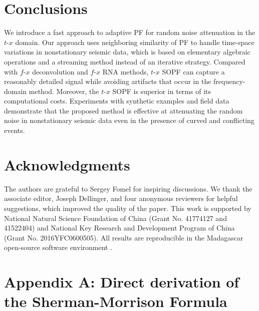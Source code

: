 

\section{Conclusions}
We introduce a fast approach to adaptive PF for random noise
attenuation in the $t$-$x$ domain. Our approach uses neighboring
similarity of PF to handle time-space variations in nonstationary
seismic data, which is based on elementary algebraic operations and a
streaming method instead of an iterative strategy. Compared with
$f$-$x$ deconvolution and $f$-$x$ RNA methods, $t$-$x$ SOPF can
capture a reasonably detailed signal while
avoiding artifacts that occur in the frequency-domain
method. Moreover, the $t$-$x$ SOPF is superior in terms of its
computational costs. Experiments with synthetic examples and field
data demonstrate that the proposed method is effective at attenuating
the random noise in nonstationary seismic data even in the presence of
curved and conflicting events.

\section{Acknowledgments}
The authors are grateful to Sergey Fomel for inspiring
discussions. We thank the associate editor, Joseph Dellinger, and
four anonymous reviewers for helpful suggestions, which improved the
quality of the paper. This work is supported by National Natural
Science Foundation of China (Grant No. 41774127 and 41522404) and
National Key Research and Development Program of China (Grant
No. 2016YFC0600505). All results are reproducible in the Madagascar
open-source software environment \cite[]{m8r}.

\appendix
\section{Appendix A: Direct derivation of the Sherman-Morrison Formula}

